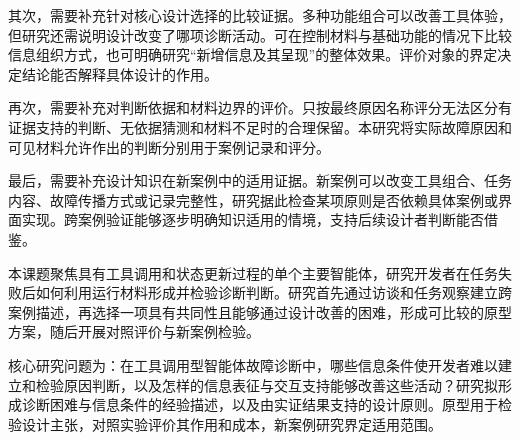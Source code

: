 其次，需要补充针对核心设计选择的比较证据。多种功能组合可以改善工具体验，但研究还需说明设计改变了哪项诊断活动。可在控制材料与基础功能的情况下比较信息组织方式，也可明确研究“新增信息及其呈现”的整体效果。评价对象的界定决定结论能否解释具体设计的作用。

再次，需要补充对判断依据和材料边界的评价。只按最终原因名称评分无法区分有证据支持的判断、无依据猜测和材料不足时的合理保留。本研究将实际故障原因和可见材料允许作出的判断分别用于案例记录和评分。

最后，需要补充设计知识在新案例中的适用证据。新案例可以改变工具组合、任务内容、故障传播方式或记录完整性，研究据此检查某项原则是否依赖具体案例或界面实现。跨案例验证能够逐步明确知识适用的情境，支持后续设计者判断能否借鉴。



本课题聚焦具有工具调用和状态更新过程的单个主要智能体，研究开发者在任务失败后如何利用运行材料形成并检验诊断判断。研究首先通过访谈和任务观察建立跨案例描述，再选择一项具有共同性且能够通过设计改善的困难，形成可比较的原型方案，随后开展对照评价与新案例检验。

核心研究问题为：在工具调用型智能体故障诊断中，哪些信息条件使开发者难以建立和检验原因判断，以及怎样的信息表征与交互支持能够改善这些活动？研究拟形成诊断困难与信息条件的经验描述，以及由实证结果支持的设计原则。原型用于检验设计主张，对照实验评价其作用和成本，新案例研究界定适用范围。
